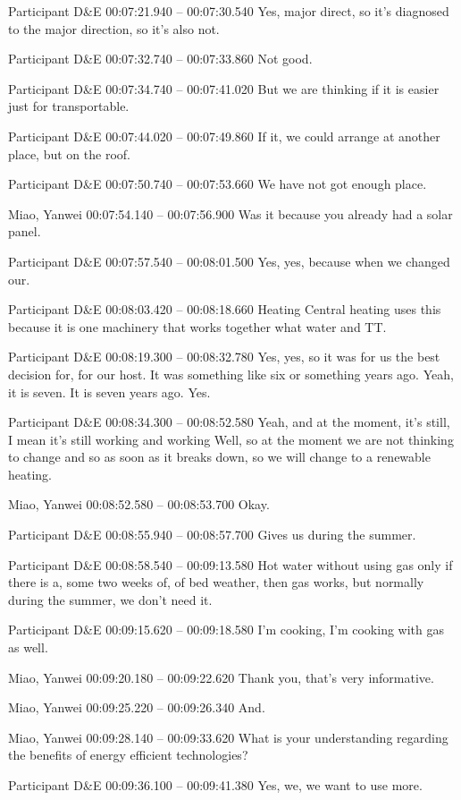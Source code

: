 {Participant D\&E 00:07:21.940 -- 00:07:30.540
Yes, major direct, so it's diagnosed to the major direction, so it's also not.

Participant D\&E 00:07:32.740 -- 00:07:33.860
Not good.

Participant D\&E 00:07:34.740 -- 00:07:41.020
But we are thinking if it is easier just for transportable.

Participant D\&E 00:07:44.020 -- 00:07:49.860
If it, we could arrange at another place, but on the roof.

Participant D\&E 00:07:50.740 -- 00:07:53.660
We have not got enough place.

Miao, Yanwei 00:07:54.140 -- 00:07:56.900
Was it because you already had a solar panel.

Participant D\&E 00:07:57.540 -- 00:08:01.500
Yes, yes, because when we changed our.

Participant D\&E 00:08:03.420 -- 00:08:18.660
Heating Central heating uses this because it is one machinery that works together what water and TT.

Participant D\&E 00:08:19.300 -- 00:08:32.780
Yes, yes, so it was for us the best decision for, for our host. It was something like six or something years ago. Yeah, it is seven. It is seven years ago. Yes.

Participant D\&E 00:08:34.300 -- 00:08:52.580
Yeah, and at the moment, it's still, I mean it's still working and working Well, so at the moment we are not thinking to change and so as soon as it breaks down, so we will change to a renewable heating.

Miao, Yanwei 00:08:52.580 -- 00:08:53.700
Okay.

Participant D\&E 00:08:55.940 -- 00:08:57.700
Gives us during the summer.

Participant D\&E 00:08:58.540 -- 00:09:13.580
Hot water without using gas only if there is a, some two weeks of, of bed weather, then gas works, but normally during the summer, we don't need it.

Participant D\&E 00:09:15.620 -- 00:09:18.580
I'm cooking, I'm cooking with gas as well.

Miao, Yanwei 00:09:20.180 -- 00:09:22.620
Thank you, that's very informative.

Miao, Yanwei 00:09:25.220 -- 00:09:26.340
And.

Miao, Yanwei 00:09:28.140 -- 00:09:33.620
What is your understanding regarding the benefits of energy efficient technologies?

Participant D\&E 00:09:36.100 -- 00:09:41.380
Yes, we, we want to use more.

}

